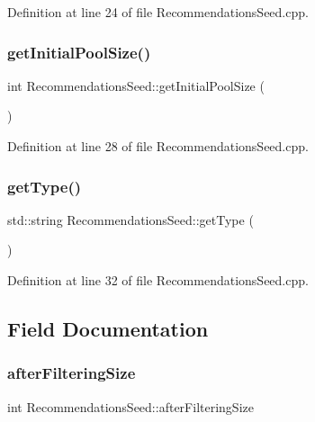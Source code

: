 Definition at line 24 of file Recommendations\+Seed.\+cpp.

\mbox{\label{class_recommendations_seed_a328237fc030c6930800def2c2853a7a8}} 
\subsubsection{\texorpdfstring{get\+Initial\+Pool\+Size()}{getInitialPoolSize()}}
{\footnotesize\ttfamily int Recommendations\+Seed\+::get\+Initial\+Pool\+Size (\begin{DoxyParamCaption}{ }\end{DoxyParamCaption})}



Definition at line 28 of file Recommendations\+Seed.\+cpp.

\mbox{\label{class_recommendations_seed_a68257f3ff5c11f18da18b3d2611fdbc4}} 
\subsubsection{\texorpdfstring{get\+Type()}{getType()}}
{\footnotesize\ttfamily std\+::string Recommendations\+Seed\+::get\+Type (\begin{DoxyParamCaption}{ }\end{DoxyParamCaption})}



Definition at line 32 of file Recommendations\+Seed.\+cpp.



\subsection{Field Documentation}
\mbox{\label{class_recommendations_seed_a322d672999401bba58248acbd6e22bc4}} 
\subsubsection{\texorpdfstring{after\+Filtering\+Size}{afterFilteringSize}}
{\footnotesize\ttfamily int Recommendations\+Seed\+::after\+Filtering\+Size\hspace{0.3cm}{\ttfamily [private]}}



